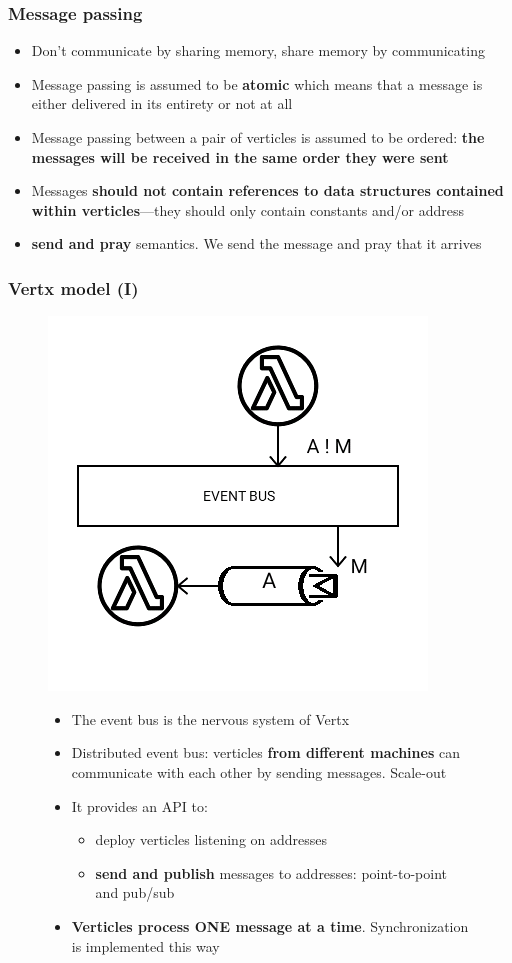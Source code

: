 \documentclass{beamer}
\begin{document}
\begin{frame}
\frametitle{Message passing}
\begin{itemize}
\item<1-> Don't communicate by sharing memory, share memory by communicating
\item<2-> Message passing is assumed to be \textbf{atomic} which means that a message is either delivered in its entirety or not at all
\item<3-> Message passing between a pair of verticles is assumed to be ordered: \textbf{the messages will be received in the same order they were sent}
\item<4-> Messages \textbf{should not contain references to data structures contained within verticles}—they should only contain constants and/or address
\item<5->\textbf{send and pray} semantics. We send the message and pray that it arrives
\end{itemize}
\end{frame}

\begin{frame}
\frametitle{Vertx model (I)}
\begin{figure}
\includegraphics[scale=0.3]{images/vertx-model-1.png}
\begin{itemize}
\item<1-> The event bus  is the nervous system of Vertx
\item<2-> Distributed event bus: verticles \textbf{from different machines} can communicate with each other by sending messages. Scale-out
\item<3-> It provides an API to:
\begin{itemize}
        \item<4-> deploy verticles listening on addresses
        \item<5-> \textbf{send and publish} messages to addresses: point-to-point and pub/sub 
\end{itemize}        
\item<6->  \textbf{Verticles process ONE message at a time}. Synchronization is implemented this way
\end{itemize}
\end{figure}
\end{frame}
\end{document}
